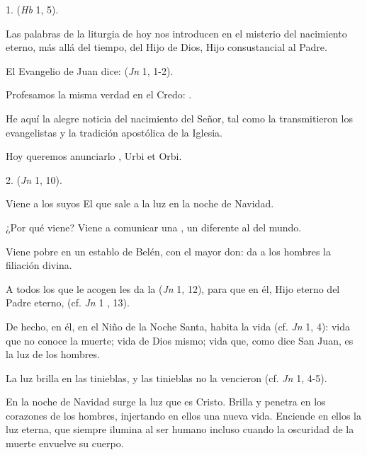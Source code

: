 						\begin{body}
							1.  (\emph{Hb} 1, 5).
							
							Las palabras de la liturgia de hoy nos introducen en el misterio del nacimiento eterno, más allá del tiempo, del Hijo de Dios, Hijo consustancial al Padre.
							
							El Evangelio de Juan dice:  (\emph{Jn} 1, 1-2).
							
							Profesamos la misma verdad en el Credo: .
							
							He aquí la alegre noticia del nacimiento del Señor, tal como la transmitieron los evangelistas y la tradición apostólica de la Iglesia.
							
							Hoy queremos anunciarlo , Urbi et Orbi.
							
							2.  (\emph{Jn} 1, 10).
							
							Viene a los suyos El que sale a la luz en la noche de Navidad.
							
							¿Por qué viene? Viene a comunicar una , un  diferente al del mundo.
							
							Viene pobre en un establo de Belén, con el mayor don: da a los hombres la filiación divina.
							
							A todos los que le acogen les da la  (\emph{Jn} 1, 12), para que en él, Hijo eterno del Padre eterno,  (cf. \emph{Jn} 1 , 13).
							
							De hecho, en él, en el Niño de la Noche Santa, habita la vida (cf. \emph{Jn} 1, 4): vida que no conoce la muerte; vida de Dios mismo; vida que, como dice San Juan, es la luz de los hombres.
							
							La luz brilla en las tinieblas, y las tinieblas no la vencieron (cf. \emph{Jn} 1, 4-5).
							
							En la noche de Navidad surge la luz que es Cristo. Brilla y penetra en los corazones de los hombres, injertando en ellos una nueva vida. Enciende en ellos la luz eterna, que siempre ilumina al ser humano incluso cuando la oscuridad de la muerte envuelve su cuerpo.
							

\end{body}
